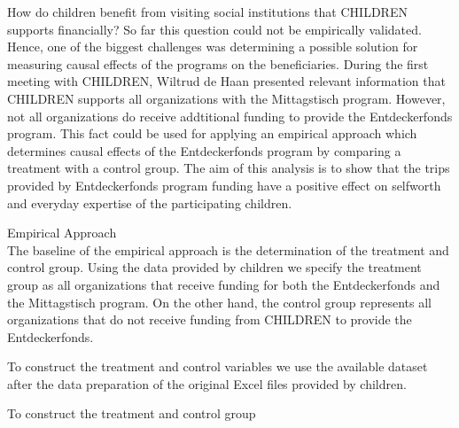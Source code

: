 \documentclass[12pt, a4paper]{article}\usepackage[]{graphicx}\usepackage[]{color}
\begin{document}
How do children benefit from visiting social institutions that CHILDREN supports financially? So far this question could not be empirically validated. Hence, one of the biggest challenges was determining a possible solution for measuring causal effects of the programs on the beneficiaries. During the first meeting with CHILDREN, Wiltrud de Haan presented relevant information that CHILDREN supports all organizations with the Mittagstisch program. However, not all organizations do receive addtitional funding to provide the Entdeckerfonds program. This fact could be used for applying an empirical approach which determines causal effects of the Entdeckerfonds program by comparing a treatment with a control group. The aim of this analysis is to show that the trips provided by Entdeckerfonds program funding have a positive effect on selfworth and everyday expertise of the participating children. 


Empirical Approach\\

The baseline of the empirical approach is the determination of the treatment and control group. Using the data provided by children we specify the treatment group as all organizations that receive funding for both the Entdeckerfonds and the Mittagstisch program. On the other hand, the control group represents all organizations that do not receive funding from CHILDREN to provide the Entdeckerfonds.

To construct the treatment and control variables we use the available dataset after the data preparation of the original Excel files provided by children.



To construct the treatment and control group
\end{document}
